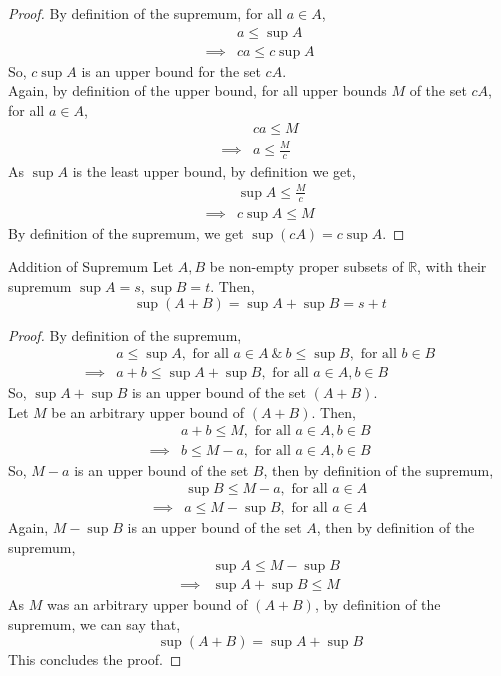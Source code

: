 \begin{proof}
    By definition of the supremum, for all $a\in A$,
    \begin{align*}
        & a\leq \sup A \\
        \implies & ca\leq c\sup A
    \end{align*}
    So, $c\sup A$ is an upper bound for the set $cA$.\\
    Again, by definition of the upper bound, for all upper bounds $M$ of the set $cA$, for all $a\in A$,
    \begin{align*}
        & ca\leq M\\
        \implies& a\leq\frac{M}{c}
    \end{align*}
    As $\sup A$ is the least upper bound, by definition we get,
    \begin{align*}
        &\sup A\leq\frac{M}{c}\\
        \implies& c\sup A\leq M
    \end{align*}
    By definition of the supremum, we get $\sup(cA)=c\sup A$.
\end{proof}
\begin{Theorem}{Addition of Supremum}\label{addition_supremum}
    Let $A, B$ be non-empty proper subsets of $\mathbb{R}$, with their supremum $\sup A= s,\sup B=t$. Then, $$\sup (A+B)=\sup A+\sup B=s+t$$
\end{Theorem}
\begin{proof}
    By definition of the supremum,
    \begin{align*}
        & a\leq\sup A,\text{ for all }a\in A\ \&\ b\leq\sup B,\text{ for all }b\in B\\
        \implies &a+b\leq\sup A+\sup B,\text{ for all }a\in A, b\in B
    \end{align*}
    So, $\sup A+\sup B$ is an upper bound of the set $(A+B)$.\\
    Let $M$ be an arbitrary upper bound of $(A+B)$. Then,
    \begin{align*}
        &a+b\leq M,\text{ for all }a\in A,b\in B\\
        \implies&b\leq M-a,\text{ for all }a\in A,b\in B
    \end{align*}
    So, $M-a$ is an upper bound of the set $B$, then by definition of the supremum,
    \begin{align*}
        &\sup B\leq M-a,\text{ for all }a\in A\\
        \implies&a\leq M-\sup B,\text{ for all }a\in A
    \end{align*}
    Again, $M-\sup B$ is an upper bound of the set $A$, then by definition of the supremum,
    \begin{align*}
        &\sup A\leq M-\sup B\\
        \implies&\sup A+\sup B\leq M
    \end{align*}
    As $M$ was an arbitrary upper bound of $(A+B)$, by definition of the supremum, we can say that, $$\sup(A+B)=\sup A+\sup B$$ This concludes the proof.
\end{proof}
